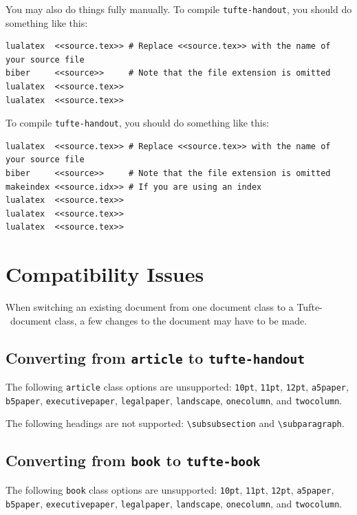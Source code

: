 \documentclass[a4paper]{tufte-handout}
\newcommand{\TL}{Tufte-\hologo{LaTeX}\xspace}
\newcommand{\hlorange}[1]{\textcolor{tufte-orange}{#1}}
\newcommand{\doccmd}[1]{\hlorange{\texttt{\textbackslash#1}}}
\newcommand{\doccls}[1]{\texttt{#1}}
\newcommand{\docclsopt}[1]{\hlorange{\texttt{#1}}}
\begin{document}
You may also do things fully manually.
To compile \doccls{tufte-handout}, you should do something like this:

\begin{fullwidth}
\begin{Verbatim}
lualatex  <<source.tex>> # Replace <<source.tex>> with the name of your source file
biber     <<source>>     # Note that the file extension is omitted
lualatex  <<source.tex>>
lualatex  <<source.tex>>
\end{Verbatim}
\end{fullwidth}

To compile \doccls{tufte-handout}, you should do something like this:

\begin{fullwidth}
\begin{Verbatim}
lualatex  <<source.tex>> # Replace <<source.tex>> with the name of your source file
biber     <<source>>     # Note that the file extension is omitted
makeindex <<source.idx>> # If you are using an index
lualatex  <<source.tex>>
lualatex  <<source.tex>>
lualatex  <<source.tex>>
\end{Verbatim}
\end{fullwidth}


\pagebreak
\section{Compatibility Issues}\label{sec:compatibility-issues}
When switching an existing document from one document class to a \TL\ document class, a few changes to the document may have to be made.

\subsection{Converting from \doccls{article} to \doccls{tufte-handout}}\label{ssec:converting-article-tufte-handout}
The following \doccls{article} class options are unsupported: \docclsopt{10pt}, \docclsopt{11pt}, \docclsopt{12pt}, \docclsopt{a5paper}, \docclsopt{b5paper}, \docclsopt{executivepaper}, \docclsopt{legalpaper}, \docclsopt{landscape}, \docclsopt{onecolumn}, and \doccls{twocolumn}.

The following headings are not supported: \doccmd{subsubsection} and \doccmd{subparagraph}.

\subsection{Converting from \doccls{book} to \doccls{tufte-book}}\label{ssec:converting-book-tufte-book}
The following \doccls{book} class options are unsupported: \docclsopt{10pt}, \docclsopt{11pt}, \docclsopt{12pt}, \docclsopt{a5paper}, \docclsopt{b5paper}, \docclsopt{executivepaper}, \docclsopt{legalpaper}, \docclsopt{landscape}, \docclsopt{onecolumn}, and \doccls{twocolumn}.
\end{document}
